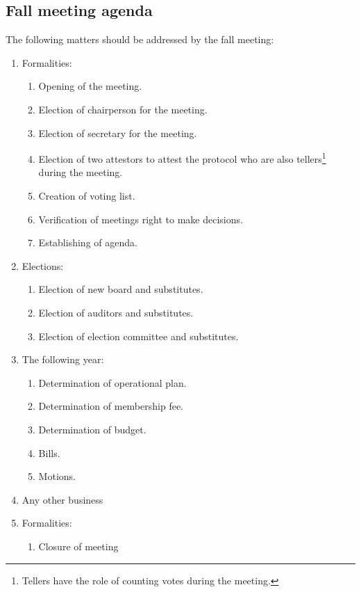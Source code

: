 
\subsection{Fall meeting agenda} \label{sec:fallAgenda}
The following matters should be addressed by the fall meeting:
\begin{enumerate}
  \item Formalities:
  \begin{enumerate}
    \item Opening of the meeting.
    \item Election of chairperson for the meeting.
    \item Election of secretary for the meeting.
    \item Election of two attestors to attest the protocol who are also tellers\footnote{Tellers have the role of counting votes during the meeting.} during the meeting.
    \item Creation of voting list.
    \item Verification of meetings right to make decisions.
    \item Establishing of agenda.
  \end{enumerate}
  \item Elections:
  \begin{enumerate}
    \item Election of new board and substitutes.
    \item Election of auditors and substitutes.
    \item Election of election committee and substitutes.
  \end{enumerate}
  \item The following year:
  \begin{enumerate}
    \item Determination of operational plan.
    \item Determination of membership fee.
    \item Determination of budget.
    \item Bills.
    \item Motions.
  \end{enumerate}
  \item Any other business
  \item Formalities:
  \begin{enumerate}
    \item Closure of meeting
  \end{enumerate}
\end{enumerate}